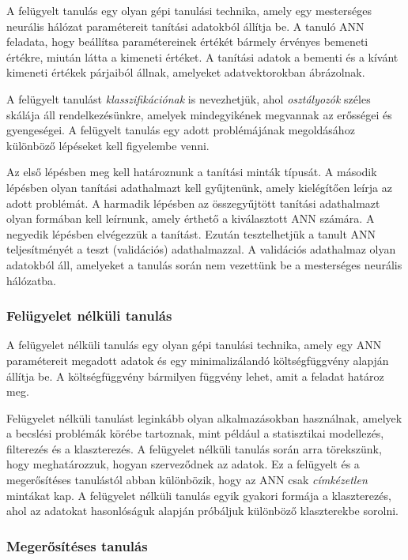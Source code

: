\documentclass[12pt,a4]{article}
\begin{document}
	A felügyelt tanulás egy olyan gépi tanulási technika, amely egy mesterséges neurális hálózat paramétereit tanítási
	adatokból állítja be. A tanuló ANN feladata, hogy beállítsa paramétereinek értékét bármely érvényes bemeneti értékre, miután látta a kimeneti értéket.
	A tanítási adatok a bementi és a kívánt kimeneti értékek párjaiból állnak, amelyeket adatvektorokban ábrázolnak.
	
	
	A felügyelt tanulást \textit{klasszifikációnak} is nevezhetjük, ahol \textit{osztályozók} széles skálája áll rendelkezésünkre, amelyek mindegyikének megvannak az erősségei és gyengeségei.
	A felügyelt tanulás egy
	adott problémájának megoldásához különböző lépéseket kell figyelembe venni.
	
	 Az első lépésben meg kell határoznunk a tanítási minták típusát. A második
	lépésben olyan tanítási adathalmazt kell gyűjtenünk, amely kielégítően leírja az adott problémát.
	A harmadik lépésben az összegyűjtött tanítási adathalmazt
	olyan formában kell leírnunk, amely érthető a kiválasztott ANN számára. A negyedik lépésben elvégezzük
	a tanítást. Ezután tesztelhetjük a tanult ANN teljesítményét a teszt (validációs) adathalmazzal.
	A validációs adathalmaz olyan adatokból áll, amelyeket a tanulás során nem vezettünk be a mesterséges neurális hálózatba.
	
	\subsubsection{Felügyelet nélküli tanulás}
	
	A felügyelet nélküli tanulás egy olyan gépi tanulási technika, amely egy ANN paramétereit megadott adatok és egy minimalizálandó 
	költségfüggvény alapján állítja be. A költségfüggvény bármilyen függvény lehet, amit a feladat határoz meg.
	
	
	Felügyelet nélküli tanulást leginkább olyan alkalmazásokban használnak, amelyek a becslési problémák körébe tartoznak, mint például a statisztikai modellezés, filterezés és a klaszterezés. A felügyelet 
	nélküli tanulás során arra törekszünk, hogy meghatározzuk, hogyan szerveződnek az adatok. Ez a felügyelt és a megerősítéses tanulástól abban különbözik, hogy az ANN csak \textit{címkézetlen} mintákat kap. A felügyelet nélküli tanulás egyik gyakori formája a klaszterezés, ahol az adatokat hasonlóságuk alapján próbáljuk különböző klaszterekbe sorolni.
	
	\subsubsection{Megerősítéses tanulás}
	
\end{document}
